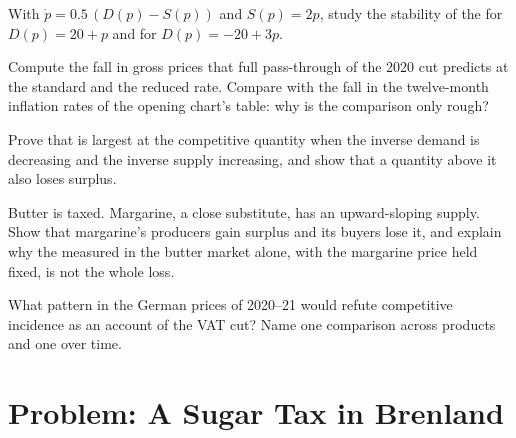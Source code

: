 \begin{exercise}[$\star\star$]\label{exo:b1:partial-equilibrium-welfare:stability-ex}
With $\dot p = 0.5\,(D(p) - S(p))$ and $S(p) = 2p$, study the stability of the
 for $D(p) = 20 + p$ and for $D(p) = -20 + 3p$.
\end{exercise}

\begin{exercise}[$\star\star$]\label{exo:b1:partial-equilibrium-welfare:vat}
Compute the fall in gross prices that full pass-through of the 2020 cut
predicts at the standard and the reduced rate. Compare with the fall in
the twelve-month inflation rates of the opening chart's table: why is the
comparison only rough?
\end{exercise}

\begin{exercise}[$\star\star\star$]\label{exo:b1:partial-equilibrium-welfare:max}
Prove that  is largest at the competitive quantity when the
inverse demand is decreasing and the inverse supply increasing, and show
that a quantity above it also loses surplus.
\end{exercise}

\begin{exercise}[$\star\star\star$]\label{exo:b1:partial-equilibrium-welfare:substitute}
Butter is taxed. Margarine, a close substitute, has an upward-sloping
supply. Show that margarine's producers gain surplus and its buyers lose
it, and explain why the  measured in the butter market
alone, with the margarine price held fixed, is not the whole loss.
\end{exercise}

\begin{exercise}[$\star\star\star$]\label{exo:b1:partial-equilibrium-welfare:refute}
What pattern in the German prices of 2020--21 would refute competitive
incidence as an account of the VAT cut? Name one comparison across
products and one over time.
\end{exercise}

\section{Problem: A Sugar Tax in Brenland}\label{sec:b1:partial-equilibrium-welfare:problem}

